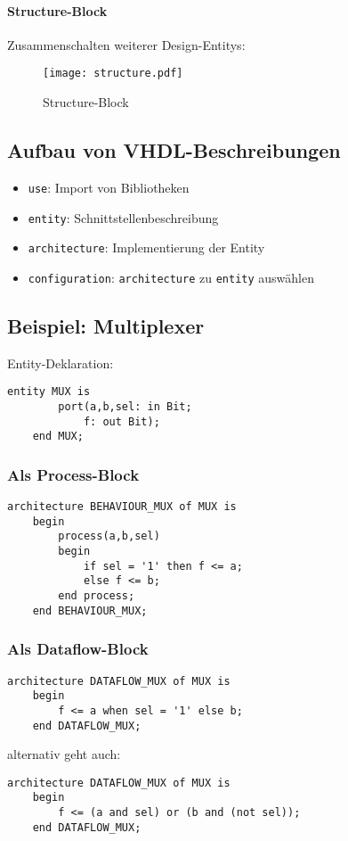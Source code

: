 \paragraph{Structure-Block}
Zusammenschalten weiterer Design-Entitys:
\begin{figure}[H]
    \centering
    \texttt{[image: structure.pdf]}
    \caption{Structure-Block}
\end{figure}

\subsection{Aufbau von VHDL-Beschreibungen}
\begin{itemize}
    \item \lstinline[style=vhdl]{use}: Import von Bibliotheken
    \item \lstinline[style=vhdl]{entity}: Schnittstellenbeschreibung
    \item \lstinline[style=vhdl]{architecture}: Implementierung der Entity
    \item \lstinline[style=vhdl]{configuration}: \lstinline[style=vhdl]{architecture} zu \lstinline[style=vhdl]{entity} auswählen
\end{itemize}

\subsection{Beispiel: Multiplexer}
Entity-Deklaration:
\begin{lstlisting}[style=vhdl]
    entity MUX is
        port(a,b,sel: in Bit;
            f: out Bit);
    end MUX;
\end{lstlisting}

\subsubsection{Als Process-Block}
\begin{lstlisting}[style=vhdl]
    architecture BEHAVIOUR_MUX of MUX is
    begin
        process(a,b,sel)
        begin
            if sel = '1' then f <= a;
            else f <= b;
        end process;
    end BEHAVIOUR_MUX;
\end{lstlisting}

\subsubsection{Als Dataflow-Block}
\begin{lstlisting}[style=vhdl]
    architecture DATAFLOW_MUX of MUX is
    begin
        f <= a when sel = '1' else b;
    end DATAFLOW_MUX;
\end{lstlisting}
alternativ geht auch:
\begin{lstlisting}[style=vhdl]
    architecture DATAFLOW_MUX of MUX is
    begin
        f <= (a and sel) or (b and (not sel));
    end DATAFLOW_MUX;
\end{lstlisting}

